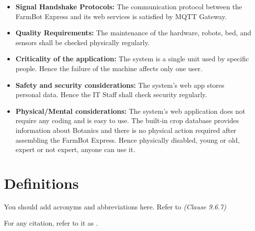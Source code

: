 \begin{itemize}
    \item \textbf{Signal Handshake Protocols:} The communication protocol between the FarmBot Express and its web services is satisfied by MQTT Gateway.

    \item \textbf{Quality Requirements:} The maintenance of the hardware, robots, bed, and sensors shall be checked physically regularly.

    \item \textbf{Criticality of the application:} The system is a single unit used by specific people. Hence the failure of the machine affects only one user.

    \item \textbf{Safety and security considerations:} The system's web app stores personal data. Hence the IT Staff shall check security regularly.

    \item \textbf{Physical/Mental considerations:} The system's web application does not require any coding and is easy to use. The built-in crop database provides information about Botanics and there is no physical action required after assembling the FarmBot Express. Hence physically disabled, young or old, expert or not expert, anyone can use it. 
\end{itemize}

\section{Definitions}

You should add acronyms and abbreviations here. Refer to \textit{(Clause 9.6.7)}



For any citation, refer to it as \cite{younis2021hybrid}.
